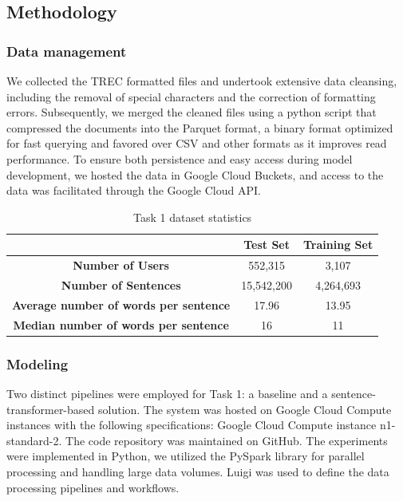 \documentclass[]{style/ceurart}
\begin{document}
\subsection{Methodology}

\subsubsection{Data management}
We collected the TREC formatted files and undertook extensive data cleansing, including the removal of special characters and the correction of formatting errors. Subsequently, we merged the cleaned files using a python script that compressed the documents into the Parquet format, a binary format optimized for fast querying and favored over CSV and other formats as it improves read performance.
To ensure both persistence and easy access during model development, we hosted the data in Google Cloud Buckets, and access to the data was facilitated through the Google Cloud API.


\begin{table}
\caption{Task 1 dataset statistics}
    \centering
    \begin{tabular}{ccc}
        \toprule
         & \textbf{Test Set} & \textbf{Training Set} \\
        \midrule
        \textbf{Number of Users} & 552,315 & 3,107 \\
        \textbf{Number of Sentences} & 15,542,200 & 4,264,693 \\
        \textbf{Average number of words per sentence} & 17.96 & 13.95 \\
        \textbf{Median number of words per sentence} & 16 & 11 \\
        \bottomrule
    \end{tabular}
\end{table}


\subsubsection{Modeling}

Two distinct pipelines were employed for Task 1: a baseline and a sentence-transformer-based solution. The system was hosted on Google Cloud Compute instances with the following specifications: Google Cloud Compute instance n1-standard-2. 
The code repository was maintained on GitHub.
The experiments were implemented in Python, we utilized the PySpark library \cite{noauthor_pyspark_nodate} for parallel processing and handling large data volumes. 
Luigi\cite{noauthor_getting_nodate} was used to define the data processing pipelines and workflows. 
\end{document}

